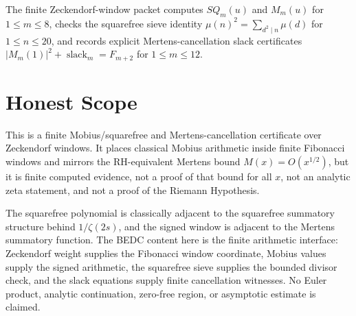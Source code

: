 \begin{theorem}
\label{thm:zeckendorf-mobius-sieve-certificate}
The finite Zeckendorf-window packet computes $SQ_m(u)$ and $M_m(u)$ for $1\leq m\leq 8$, checks the squarefree sieve identity $\mu(n)^2=\sum_{d^2\mid n}\mu(d)$ for $1\leq n\leq 20$, and records explicit Mertens-cancellation slack certificates $|M_m(1)|^2+\operatorname{slack}_m=F_{m+2}$ for $1\leq m\leq 12$.
\end{theorem}

\section{Honest Scope}
\label{sec:zeckendorf-mobius-honest-scope}

This is a finite Mobius/squarefree and Mertens-cancellation certificate over Zeckendorf windows. It places classical Mobius arithmetic inside finite Fibonacci windows and mirrors the RH-equivalent Mertens bound $M(x)=O(x^{1/2})$, but it is finite computed evidence, not a proof of that bound for all $x$, not an analytic zeta statement, and not a proof of the Riemann Hypothesis.

The squarefree polynomial is classically adjacent to the squarefree summatory structure behind $1/\zeta(2s)$, and the signed window is adjacent to the Mertens summatory function. The BEDC content here is the finite arithmetic interface: Zeckendorf weight supplies the Fibonacci window coordinate, Mobius values supply the signed arithmetic, the squarefree sieve supplies the bounded divisor check, and the slack equations supply finite cancellation witnesses. No Euler product, analytic continuation, zero-free region, or asymptotic estimate is claimed.



